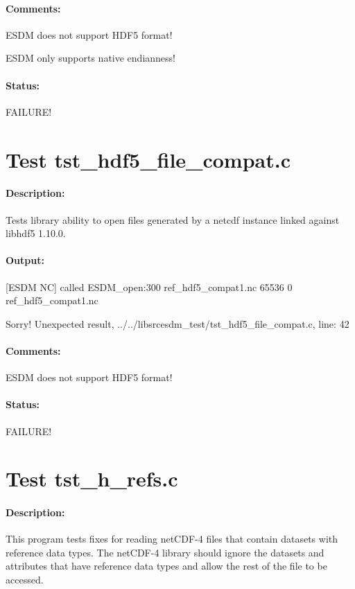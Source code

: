 \paragraph{Comments:} ESDM does not support HDF5 format!

ESDM only supports native endianness!

\paragraph{Status:} FAILURE!

\section{Test tst\_hdf5\_file\_compat.c}

\paragraph{Description:} Tests library ability to open files generated by a netcdf instance linked against libhdf5 1.10.0.

\paragraph{Output:} [ESDM NC] called ESDM\_open:300 ref\_hdf5\_compat1.nc 65536 0 ref\_hdf5\_compat1.nc

Sorry! Unexpected result, ../../libsrcesdm\_test/tst\_hdf5\_file\_compat.c, line: 42

\paragraph{Comments:} ESDM does not support HDF5 format!

\paragraph{Status:} FAILURE!

\section{Test tst\_h\_refs.c}

\paragraph{Description:} This program tests fixes for reading netCDF-4 files that contain datasets with reference data types.  The netCDF-4 library should ignore the datasets and attributes that have reference data types and allow the rest of the file to be accessed.

